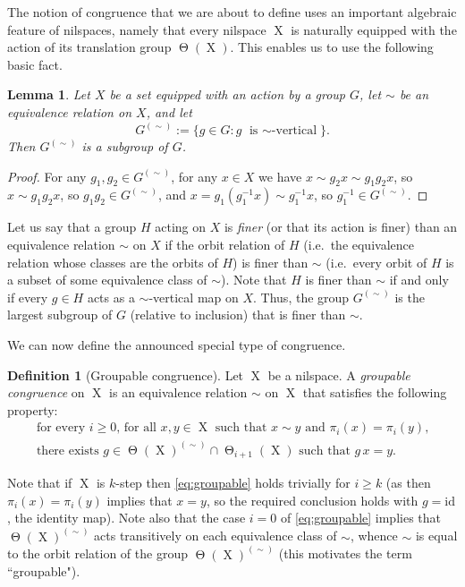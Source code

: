 \documentclass[a4paper,12pt,reqno]{amsart}
\newtheorem{lemma}[theorem]{Lemma}
\theoremstyle{definition}
\newtheorem{defn}[theorem]{Definition}
\newcommand{\id}{\mathrm{id}}
\DeclareMathOperator{\tran}{\Theta}
\DeclareMathOperator{\ns}{X}
\begin{document}
The notion of congruence that we are about to define uses an important algebraic feature of nilspaces, namely that every nilspace $\ns$ is naturally equipped with the action of its translation group $\tran(\ns)$. This enables us to use the following basic fact.
\begin{lemma}
Let $X$ be a set equipped with an action by a group $G$, let $\sim$ be an equivalence relation on $X$, and let 
\begin{equation}
G^{(\sim)}:=\{g\in G: g\textrm{ is $\sim$-vertical}\}.
\end{equation}
Then $G^{(\sim)}$ is a subgroup of $G$.
\end{lemma}
\begin{proof}
For any $g_1,g_2\in G^{(\sim)}$, for any $x\in X$ we have $x\sim g_2 x\sim g_1g_2x$, so $x\sim g_1g_2x$, so $g_1g_2\in G^{(\sim)}$, and $x=g_1 (g_1^{-1} x)\sim g_1^{-1} x$, so $g_1^{-1}\in G^{(\sim)}$.
\end{proof}
Let us say that a group $H$ acting on $X$ is \emph{finer} (or that its action is finer) than an equivalence relation $\sim$ on $X$ if the orbit relation of $H$ (i.e.\ the equivalence relation whose classes are the orbits of $H$) is finer than $\sim$ (i.e.\ every orbit of $H$ is a subset of some equivalence class of $\sim$). Note that $H$ is finer than $\sim$ if and only if every $g\in H$ acts as a $\sim$-vertical map on $X$. Thus, the group $G^{(\sim)}$ is the largest subgroup of $G$ (relative to inclusion) that is finer than $\sim$.

We can now define the announced special type of congruence.
\begin{defn}[Groupable congruence]\label{def:groupable}
Let $\ns$ be a nilspace. A \emph{groupable congruence} on $\ns$ is an equivalence relation $\sim$ on $\ns$ that satisfies the following property:
\begin{eqnarray}\label{eq:groupable}
&\textrm{for every $i\geq 0$, for all $x,y\in \ns$ such that $x\sim y$ and $\pi_i(x)=\pi_i(y)$,}&\nonumber \\
&\textrm{there exists $g\in \tran(\ns)^{(\sim)}\cap \tran_{i+1}(\ns)$ such that $g\,x=y$.}&
\end{eqnarray}
\end{defn}
\noindent Note that if $\ns$ is $k$-step then \eqref{eq:groupable} holds trivially for $i\geq k$ (as then $\pi_i(x)=\pi_i(y)$ implies that $x=y$, so the required conclusion holds with $g=\id$, the identity map). Note also that the case $i=0$ of  \eqref{eq:groupable} implies that $\tran(\ns)^{(\sim)}$ acts transitively on each equivalence class of $\sim$, whence $\sim$ is equal to the orbit relation of the group $\tran(\ns)^{(\sim)}$ (this motivates the term ``groupable").
\end{document}
